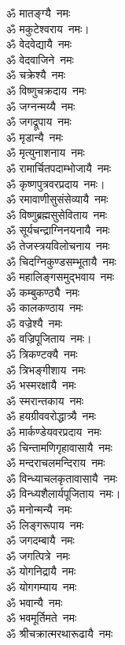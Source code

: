\begin{multicols}{2}
\begin{flushleft}
ॐ मातङ्ग्यै~नमः\\
ॐ मकुटेश्वराय~नमः।\hfill{}\\
ॐ वेदवेद्यायै~नमः\\
ॐ वेदवाजिने~नमः\\
ॐ चक्रेश्यै~नमः\\
ॐ विष्णुचक्रदाय~नमः\\
ॐ जग्नन्मय्यै~नमः\\
ॐ जगद्रूपाय~नमः\\
ॐ मृडान्यै~नमः\\
ॐ मृत्युनाशनाय~नमः\\
ॐ रामार्चितपदाम्भोजायै~नमः\\
ॐ कृष्णपुत्रवरप्रदाय~नमः।\hfill{}\\
ॐ रमावाणीसुसंसेव्यायै~नमः\\
ॐ विष्णुब्रह्मसुसेविताय~नमः\\
ॐ सूर्यचन्द्राग्निनयनायै~नमः\\
ॐ तेजस्त्रयविलोचनाय~नमः\\
ॐ चिदग्निकुण्डसम्भूतायै~नमः\\
ॐ महालिङ्गसमुद्भवाय~नमः\\
ॐ कम्बुकण्ठ्यै~नमः\\
ॐ कालकण्ठाय~नमः\\
ॐ वज्रेश्यै~नमः\\
ॐ वज्रिपूजिताय~नमः।\hfill{}\\
ॐ त्रिकण्टक्यै~नमः\\
ॐ त्रिभङ्गीशाय~नमः\\
ॐ भस्मरक्षायै~नमः\\
ॐ स्मरान्तकाय~नमः\\
ॐ हयग्रीववरोद्धात्र्यै~नमः\\
ॐ मार्कण्डेयवरप्रदाय~नमः\\
ॐ चिन्तामणिगृहावासायै~नमः\\
ॐ मन्दराचलमन्दिराय~नमः\\
ॐ विन्ध्याचलकृतावासायै~नमः\\
ॐ विन्ध्यशैलार्यपूजिताय~नमः।\hfill{}\\
ॐ मनोन्मन्यै~नमः\\
ॐ लिङ्गरूपाय~नमः\\
ॐ जगदम्बायै~नमः\\
ॐ जगत्पित्रे~नमः\\
ॐ योगनिद्रायै~नमः\\
ॐ योगगम्याय~नमः\\
ॐ भवान्यै~नमः\\
ॐ भवमूर्तिमते~नमः\\
ॐ श्रीचक्रात्मरथारूढायै~नमः\\

\end{flushleft}
\end{multicols}
